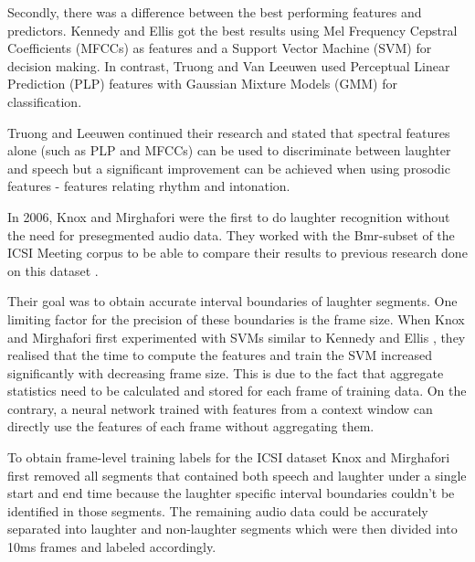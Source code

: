 \documentclass[bsc,frontabs,parskip,deptreport]{infthesis}
\begin{document}
Secondly, there was a difference between the best performing features and predictors.  
Kennedy and Ellis \cite{kennedy2004laughter} got the best results using Mel Frequency Cepstral Coefficients (MFCCs) as features and a Support Vector Machine (SVM) for decision making. 
In contrast, Truong and Van Leeuwen \cite{truong2005automatic} used Perceptual Linear Prediction (PLP) features with Gaussian Mixture Models (GMM) for classification. 

Truong and Leeuwen \cite{truong2007automatic} continued their research and stated that spectral features alone (such as PLP and MFCCs) can be used to discriminate between laughter and speech but a significant improvement can be achieved when using prosodic features - features relating rhythm and intonation.

In 2006, Knox and Mirghafori \cite{knox2006automatic} were the first to do laughter recognition without the need for presegmented audio data.  
They worked with the Bmr-subset of the ICSI Meeting corpus \cite{morgan2001meeting} to be able to compare their results to previous research done on this dataset \cite{kennedy2004laughter, truong2005automatic, truong2007automatic}.

Their goal was to obtain accurate interval boundaries of laughter segments.
One limiting factor for the precision of these boundaries is the frame size. 
When Knox and Mirghafori first experimented with SVMs similar to Kennedy and Ellis \cite{kennedy2004laughter}, they realised that the time to compute the features and train the SVM increased significantly with decreasing frame size. 
This is due to the fact that aggregate statistics need to be calculated and stored for each frame of training data.  
On the contrary, a neural network trained with features from a context window can directly use the features of each frame without aggregating them.  

To obtain frame-level training labels for the ICSI dataset Knox and Mirghafori first removed all segments that contained both speech and laughter under a single start and end time because the laughter specific interval boundaries couldn't be identified in those segments. 
The remaining audio data could be accurately separated into laughter and non-laughter segments which were then divided into 10ms frames and labeled accordingly.
\end{document}
